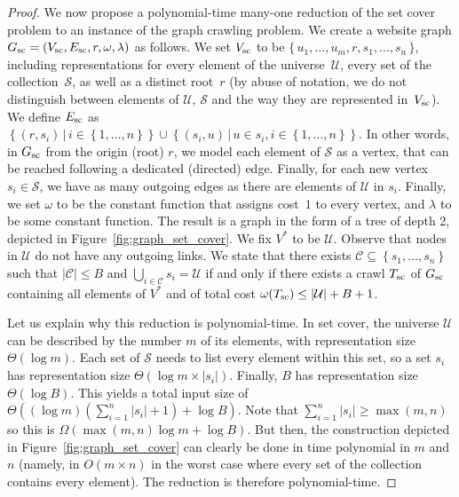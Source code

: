 \begin{proof}
	We now propose a polynomial-time many-one reduction of the set cover problem to an instance of
	the graph crawling problem. We create a website graph
	$G_\sc = \left(V_\sc, E_\sc, r, \omega,
		\lambda\right)$ as follows. We set $V_\sc$ to be
	$\{\,u_1,\dots,u_m,r,s_1,\dots,s_n\,\}$, including representations for
	every element of the universe~$\mathcal{U}$, every set of the
	collection~$\mathcal{S}$, as well as a distinct root~$r$ (by abuse of
	notation, we do not distinguish between elements of $\mathcal{U}$,
	$\mathcal{S}$ and the way they are represented in~$V_\sc$).
	We define $E_\sc$ as $\left\{\left(r, s_i\right) \, |
		\, i \in \left\{1, \dots, n\right\}\right\} \cup \left\{\left(s_i,
		u\right) \, | \, u \in s_i, i \in \left\{1, \dots, n\right\}\right\}$.
	In other words, in $G_\sc$ from the origin
	(root) $r$, we model each element of $\mathcal{S}$ as a vertex, that
	can be reached following a dedicated (directed) edge. Finally, for
	each new vertex $s_i \in \mathcal{S}$, we have as many outgoing edges
	as there are elements of $\mathcal{U}$ in $s_i$. Finally, we set
	$\omega$ to be the constant function that assigns cost~$1$ to every
	vertex, and $\lambda$ to be some constant function.
	The result is a graph in the form of a tree of depth 2, depicted in
	Figure~\ref{fig:graph_set_cover}. We fix $V^*$ to be
  $\mathcal{U}$. Observe that nodes in $\mathcal{U}$ do not have
  any outgoing links. We state that there exists
	$\mathcal{C} \subseteq \left\{s_1, \dots, s_n\right\}$ such that
	$\left\lvert \mathcal{C} \right\rvert \leq B$ and $\bigcup_{i \in
			\mathcal{C}} s_i = \mathcal{U}$ if and only if there exists a crawl
	$T_\sc$ of $G_\sc$ containing all elements of $V^*$ and of total cost
	$\omega(T_\sc) \leq \left\lvert \mathcal{U} \right\rvert + B + 1$.

	Let us explain why this reduction is
	polynomial-time. In set cover, the universe $\mathcal{U}$ can be
	described by the number $m$ of its elements, with representation size
	$\Theta(\log m)$. Each set of $\mathcal{S}$ needs to list every element
	within this set, so a set $s_i$ has representation size $\Theta(\log
		m\times |s_i|)$. Finally, $B$ has representation size $\Theta(\log B)$.
	This yields a total input size of $\Theta((\log
		m)\left(\sum_{i=1}^n|s_i|+1\right)+\log B)$. Note that $\sum_{i=1}^n
		|s_i|\geq \max(m,n)$ so this is $\Omega(\max(m,n)\log m+\log B)$.
	But then, the construction depicted in
	Figure~\ref{fig:graph_set_cover} can clearly be done in time
	polynomial in $m$ and $n$ (namely, in $O(m\times n)$ in the
	worst case where every set of the collection contains every element).
	The reduction is therefore polynomial-time.


\end{proof}
